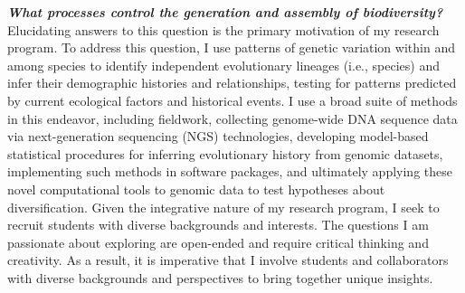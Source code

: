 \textbf{\textit{What processes control the generation and assembly of
        biodiversity?}}
Elucidating answers to this question is the primary motivation of my research
program.
To address this question, I use patterns of genetic variation within and among
species to identify independent evolutionary lineages (i.e., species) and infer
their demographic histories and relationships, testing for patterns predicted
by current ecological factors and historical events.
I use a broad suite of methods in this endeavor, including
fieldwork,
collecting genome-wide DNA sequence data via next-generation sequencing (NGS)
technologies,
developing model-based statistical procedures for inferring evolutionary
history from genomic datasets,
implementing such methods in software packages,
and ultimately applying these novel computational tools to genomic data to test
hypotheses about diversification.
Given the integrative nature of my research program, I seek to recruit students
with diverse backgrounds and interests.
The questions I am passionate about exploring are open-ended and require
critical thinking and creativity.
As a result, it is imperative that I involve students and collaborators with
diverse backgrounds and perspectives to bring together unique insights.

